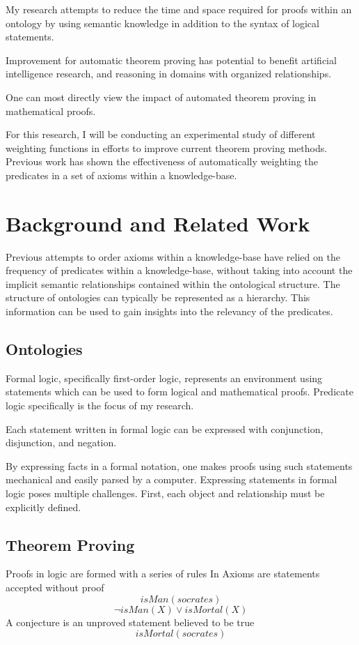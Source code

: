 \documentclass{article}
\begin{document}
My research attempts to reduce the time and space required for proofs within an ontology by using semantic knowledge in addition to the syntax of logical statements. 

Improvement for automatic theorem proving has potential to benefit artificial intelligence research, and reasoning in domains with organized relationships. 

One can most directly view the impact of automated theorem proving in mathematical proofs. 

For this research, I will be conducting an experimental study of different weighting functions in efforts to improve current theorem proving methods. Previous work has shown the effectiveness of automatically weighting the predicates in a set of axioms within a knowledge-base.

	\newpage
	\section{Background and Related Work}

Previous attempts to order axioms within a knowledge-base have relied on the frequency of predicates within a knowledge-base, without taking into account the implicit semantic relationships contained within the ontological structure. The structure of ontologies can typically be represented as a hierarchy. This information can be used to gain insights into the relevancy of the predicates. 

		\subsection{Ontologies}
Formal logic, specifically first-order logic, represents an environment using statements which can be used to form logical and mathematical proofs. Predicate logic specifically is the focus of my research. 

Each statement written in formal logic can be expressed with conjunction, disjunction, and negation. 

By expressing facts in a formal notation, one makes proofs using such statements mechanical and easily parsed by a computer. Expressing statements in formal logic poses multiple challenges. First, each object and relationship must be explicitly defined. 
	
		\subsection{Theorem Proving}
Proofs in logic are formed with a series of rules 
In Axioms are statements accepted without proof
        \[isMan(socrates)\]
        \[\lnot isMan(X)\lor isMortal(X)\]
	    A conjecture is an unproved statement believed to be true 
	    \[isMortal(socrates)\]
	
\end{document}
